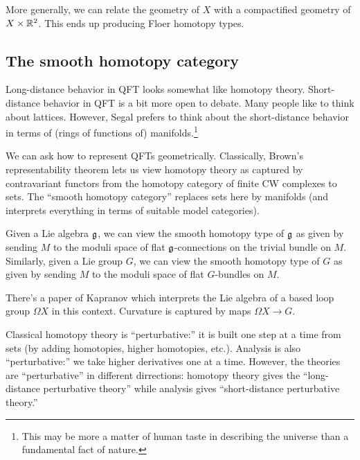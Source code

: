 More generally, we can relate the geometry of $X$ with a compactified geometry of $X \times \mathbb{R}^2$.
This ends up producing Floer homotopy types.

\subsection{The smooth homotopy category}

Long-distance behavior in QFT looks somewhat like homotopy theory.
Short-distance behavior in QFT is a bit more open to debate.
Many people like to think about lattices.
However, Segal prefers to think about the short-distance behavior in terms of (rings of functions of) manifolds.\footnote{This may be more a matter of human taste in describing the universe than a fundamental fact of nature.}

We can ask how to represent QFTs geometrically.
Classically, Brown's representability theorem lets us view homotopy theory as captured by contravariant functors from the homotopy category of finite CW complexes to sets.
The ``smooth homotopy category'' replaces sets here by manifolds (and interprets everything in terms of suitable model categories).

\begin{ex}
	Given a Lie algebra $\mathfrak{g}$, we can view the smooth homotopy type of $\mathfrak{g}$ as given by sending $M$ to the moduli space of flat $\mathfrak{g}$-connections on the trivial bundle on $M$.
	Similarly, given a Lie group $G$, we can view the smooth homotopy type of $G$ as given by sending $M$ to the moduli space of flat $G$-bundles on $M$.
\end{ex}

There's a paper of Kapranov which interprets the Lie algebra of a based loop group $\Omega X$ in this context.
Curvature is captured by maps $\Omega X \to G$.

Classical homotopy theory is ``perturbative:'' it is built one step at a time from sets (by adding homotopies, higher homotopies, etc.).
Analysis is also ``perturbative:'' we take higher derivatives one at a time.
However, the theories are ``perturbative'' in different dirrections: homotopy theory gives the ``long-distance perturbative theory'' while analysis gives ``short-distance perturbative theory.''
